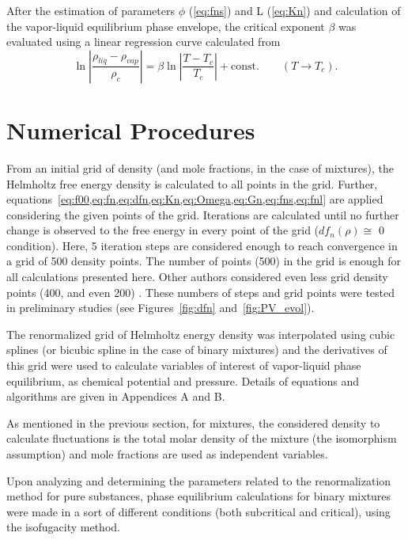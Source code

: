 \documentclass[preprint,12pt,3p]{elsarticle}
\begin{document}
    After the estimation of parameters $\phi$ (\cref{eq:fns}) and L (\cref{eq:Kn}) and calculation of the vapor-liquid equilibrium phase envelope, the critical exponent $\beta$ was evaluated using a linear regression curve calculated from
\begin{equation} \label{eq:beta_law}
    \ln\left|\frac{\rho_{liq}-\rho_{vap}}{\rho_{c}}\right| = \beta \ln\left|\frac{T-T_{c}}{T_{c}}\right|+\text{const.} \qquad (T \rightarrow T_{c}).
\end{equation}

\section{Numerical Procedures}
    From an initial grid of density (and mole fractions, in the case of mixtures), the Helmholtz free energy density is calculated to all points in the grid. Further, equations~\cref{eq:f00,eq:fn,eq:dfn,eq:Kn,eq:Omega,eq:Gn,eq:fns,eq:fnl} are applied considering the given points of the grid. Iterations are calculated until no further change is observed to the free energy in every point of the grid ($df_{n}(\rho) \cong$ 0 condition). Here, 5 iteration steps are considered enough to reach convergence in a grid of 500 density points. The number of points (500) in the grid is enough for all calculations presented here. Other authors considered even less grid density points (400, and even 200) \cite{cai2004thermodynamics}. These numbers of steps and grid points were tested in preliminary studies (see Figures~\ref{fig:dfn} and~\ref{fig:PV_evol}).

    The renormalized grid of Helmholtz energy density was interpolated using cubic splines (or bicubic spline in the case of binary mixtures) and the derivatives of this grid were used to calculate variables of interest of vapor-liquid phase equilibrium, as chemical potential and pressure. Details of equations and algorithms are given in Appendices A and B.

    As mentioned in the previous section, for mixtures, the considered density to calculate fluctuations is the total molar density of the mixture (the isomorphism assumption) and mole fractions are used as independent variables.

    Upon analyzing and determining the parameters related to the renormalization method for pure substances, phase equilibrium calculations for binary mixtures were made in a sort of different conditions (both subcritical and critical), using the isofugacity method.
    
\end{document}
